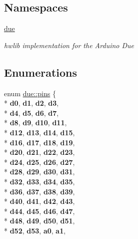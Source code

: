 \subsection*{Namespaces}
\begin{DoxyCompactItemize}
\item 
 \hyperlink{namespacedue}{due}
\begin{DoxyCompactList}\small\item\em hwlib implementation for the Arduino Due \end{DoxyCompactList}\end{DoxyCompactItemize}
\subsection*{Enumerations}
\begin{DoxyCompactItemize}
\item 
enum \hyperlink{namespacedue_a8ffa3ec309934ff9db34317e504bcc92}{due\+::pins} \{ \\*
{\bfseries d0}, 
{\bfseries d1}, 
{\bfseries d2}, 
{\bfseries d3}, 
\\*
{\bfseries d4}, 
{\bfseries d5}, 
{\bfseries d6}, 
{\bfseries d7}, 
\\*
{\bfseries d8}, 
{\bfseries d9}, 
{\bfseries d10}, 
{\bfseries d11}, 
\\*
{\bfseries d12}, 
{\bfseries d13}, 
{\bfseries d14}, 
{\bfseries d15}, 
\\*
{\bfseries d16}, 
{\bfseries d17}, 
{\bfseries d18}, 
{\bfseries d19}, 
\\*
{\bfseries d20}, 
{\bfseries d21}, 
{\bfseries d22}, 
{\bfseries d23}, 
\\*
{\bfseries d24}, 
{\bfseries d25}, 
{\bfseries d26}, 
{\bfseries d27}, 
\\*
{\bfseries d28}, 
{\bfseries d29}, 
{\bfseries d30}, 
{\bfseries d31}, 
\\*
{\bfseries d32}, 
{\bfseries d33}, 
{\bfseries d34}, 
{\bfseries d35}, 
\\*
{\bfseries d36}, 
{\bfseries d37}, 
{\bfseries d38}, 
{\bfseries d39}, 
\\*
{\bfseries d40}, 
{\bfseries d41}, 
{\bfseries d42}, 
{\bfseries d43}, 
\\*
{\bfseries d44}, 
{\bfseries d45}, 
{\bfseries d46}, 
{\bfseries d47}, 
\\*
{\bfseries d48}, 
{\bfseries d49}, 
{\bfseries d50}, 
{\bfseries d51}, 
\\*
{\bfseries d52}, 
{\bfseries d53}, 
{\bfseries a0}, 
{\bfseries a1}, 

\end{DoxyCompactItemize}

